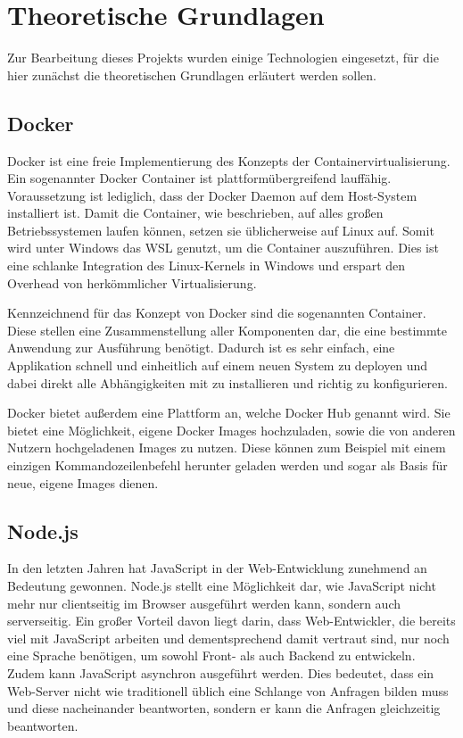 \chapter{Theoretische Grundlagen}
Zur Bearbeitung dieses Projekts wurden einige Technologien eingesetzt, für die hier zunächst die theoretischen Grundlagen erläutert werden sollen.

\section{Docker}
Docker ist eine freie Implementierung des Konzepts der Containervirtualisierung. Ein sogenannter Docker Container ist plattformübergreifend lauffähig. Voraussetzung ist lediglich, dass der Docker Daemon auf dem Host-System installiert ist. Damit die Container, wie beschrieben, auf alles großen Betriebssystemen laufen können, setzen sie üblicherweise auf Linux auf. Somit wird unter Windows das \ac{WSL} genutzt, um die Container auszuführen. Dies ist eine schlanke Integration des Linux-Kernels in Windows und erspart den Overhead von herkömmlicher Virtualisierung.

Kennzeichnend für das Konzept von Docker sind die sogenannten Container. Diese stellen eine Zusammenstellung aller Komponenten dar, die eine bestimmte Anwendung zur Ausführung benötigt. Dadurch ist es sehr einfach, eine Applikation schnell und einheitlich auf einem neuen System zu deployen und dabei direkt alle Abhängigkeiten mit zu installieren und richtig zu konfigurieren.

Docker bietet außerdem eine Plattform an, welche Docker Hub genannt wird. Sie bietet eine Möglichkeit, eigene Docker Images hochzuladen, sowie die von anderen Nutzern hochgeladenen Images zu nutzen. Diese können zum Beispiel mit einem einzigen Kommandozeilenbefehl herunter geladen werden und sogar als Basis für neue, eigene Images dienen.

\section{Node.js}
In den letzten Jahren hat JavaScript in der Web-Entwicklung zunehmend an Bedeutung gewonnen. Node.js stellt eine Möglichkeit dar, wie JavaScript nicht mehr nur clientseitig im Browser ausgeführt werden kann, sondern auch serverseitig. Ein großer Vorteil davon liegt darin, dass Web-Entwickler, die bereits viel mit JavaScript arbeiten und dementsprechend damit vertraut sind, nur noch eine Sprache benötigen, um sowohl Front- als auch Backend zu entwickeln.
Zudem kann JavaScript asynchron ausgeführt werden. Dies bedeutet, dass ein Web-Server nicht wie traditionell üblich eine Schlange von Anfragen bilden muss und diese nacheinander beantworten, sondern er kann die Anfragen gleichzeitig beantworten.

